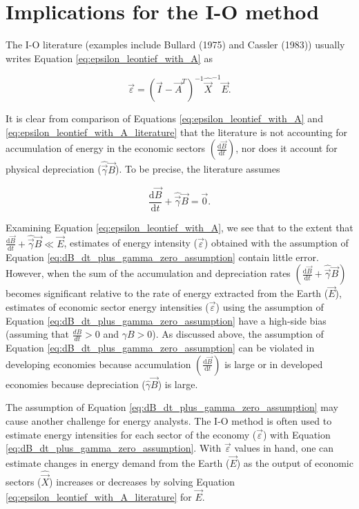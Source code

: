 \section{Implications for the I-O method}

The I-O literature (examples include Bullard (1975) and Cassler (1983)) usually writes Equation \ref{eq:epsilon_leontief_with_A} as

\begin{equation} \label{eq:epsilon_leontief_with_A_literature}
	\vec{\varepsilon} = (\vec{I} - \vec{A}^{T})^{-1}\hat{\vec{X}}^{-1}\vec{E}.
\end{equation}

\noindent It is clear from comparison of Equations \ref{eq:epsilon_leontief_with_A} and \ref{eq:epsilon_leontief_with_A_literature} that the literature is not accounting for accumulation of energy in the economic sectors $\left(\frac{\mathrm{d}\vec{B}}{\mathrm{d}t}\right)$, nor does it account for physical depreciation ($\hat{\vec{\gamma}}\vec{B}$). To be precise, the literature assumes

\begin{equation} \label{eq:dB_dt_plus_gamma_zero_assumption}
	\frac{\mathrm{d}\vec{B}}{\mathrm{d}t} + \hat{\vec{\gamma}}\vec{B} = \vec{0}.
\end{equation}

Examining Equation \ref{eq:epsilon_leontief_with_A}, we see that to the extent that $\frac{\mathrm{d}\vec{B}}{\mathrm{d}t} + \hat{\vec{\gamma}}\vec{B} \ll \vec{E}$, estimates of energy intensity ($\vec{\varepsilon}$) obtained with the assumption of Equation \ref{eq:dB_dt_plus_gamma_zero_assumption} contain little error. However, when the sum of the accumulation and depreciation rates $\left(\frac{\mathrm{d}\vec{B}}{\mathrm{d}t} + \hat{\vec{\gamma}}\vec{B}\right)$ becomes significant relative to the rate of energy extracted from the Earth ($\vec{E}$), estimates of economic sector energy intensities ($\vec{\varepsilon}$) using the assumption of Equation \ref{eq:dB_dt_plus_gamma_zero_assumption} have a high-side bias (assuming that $\frac{dB}{dt} >0$ and $\gamma B > 0$). As discussed above, the assumption of Equation \ref{eq:dB_dt_plus_gamma_zero_assumption} can be violated in developing economies because accumulation $\left(\frac{\mathrm{d}\vec{B}}{\mathrm{d}t}\right)$ is large or in developed economies because depreciation ($\hat{\gamma}\vec{B}$) is large. 

The assumption of Equation \ref{eq:dB_dt_plus_gamma_zero_assumption} may cause another challenge for energy analysts. The I-O method is often used to estimate energy intensities for each sector of the economy ($\vec{\varepsilon}$) with Equation \ref{eq:dB_dt_plus_gamma_zero_assumption}. With $\vec{\varepsilon}$ values in hand, one can estimate changes in energy demand from the Earth ($\vec{E}$) as the output of economic sectors ($\hat{\vec{X}}$) increases or decreases by solving Equation \ref{eq:epsilon_leontief_with_A_literature} for $\vec{E}$.


